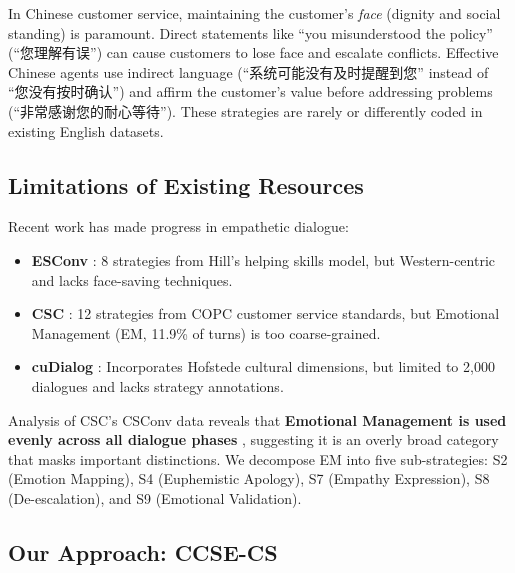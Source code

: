 \documentclass[11pt]{article}
\begin{document}
In Chinese customer service, maintaining the customer's \textit{face} (dignity and social standing) is paramount. Direct statements like ``you misunderstood the policy'' (``您理解有误'') can cause customers to lose face and escalate conflicts. Effective Chinese agents use indirect language (``系统可能没有及时提醒到您'' instead of ``您没有按时确认'') and affirm the customer's value before addressing problems (``非常感谢您的耐心等待''). These strategies are rarely or differently coded in existing English datasets.

\subsection*{Limitations of Existing Resources}

Recent work has made progress in empathetic dialogue:
\begin{itemize}
  \item \textbf{ESConv} \cite{ESConv_2022}: 8 strategies from Hill's helping skills model, but Western-centric and lacks face-saving techniques.
  \item \textbf{CSC} \cite{CSC_2024}: 12 strategies from COPC customer service standards, but Emotional Management (EM, 11.9\% of turns) is too coarse-grained.
  \item \textbf{cuDialog} \cite{cuDialog_2024}: Incorporates Hofstede cultural dimensions, but limited to 2,000 dialogues and lacks strategy annotations.
\end{itemize}

Analysis of CSC's CSConv data reveals that \textbf{Emotional Management is used evenly across all dialogue phases} \cite{CSC_2024}, suggesting it is an overly broad category that masks important distinctions. We decompose EM into five sub-strategies: S2 (Emotion Mapping), S4 (Euphemistic Apology), S7 (Empathy Expression), S8 (De-escalation), and S9 (Emotional Validation).

\subsection*{Our Approach: CCSE-CS}
\end{document}
